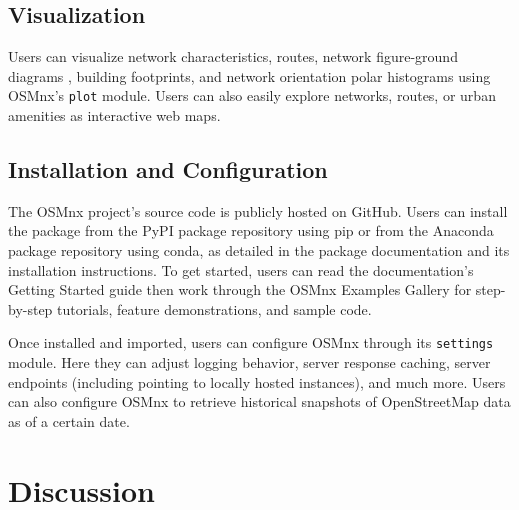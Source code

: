 \documentclass[12pt,letterpaper]{article} %
\begin{document}
\subsection{Visualization}

Users can visualize network characteristics, routes, network figure-ground diagrams \citep{boeing_spatial_2021}, building footprints, and network orientation polar histograms \citep{boeing_urban_2019} using OSMnx's \texttt{plot} module. Users can also easily explore networks, routes, or urban amenities as interactive web maps.

\subsection{Installation and Configuration}

The OSMnx project's source code is publicly hosted on GitHub. Users can install the package from the PyPI package repository using pip or from the Anaconda package repository using conda, as detailed in the package documentation and its installation instructions. To get started, users can read the documentation's Getting Started guide then work through the OSMnx Examples Gallery for step-by-step tutorials, feature demonstrations, and sample code.

Once installed and imported, users can configure OSMnx through its \texttt{settings} module. Here they can adjust logging behavior, server response caching, server endpoints (including pointing to locally hosted instances), and much more. Users can also configure OSMnx to retrieve historical snapshots of OpenStreetMap data as of a certain date.

\section{Discussion}




\setlength{\bibsep}{0.00cm plus 0.05cm} %


\end{document}
